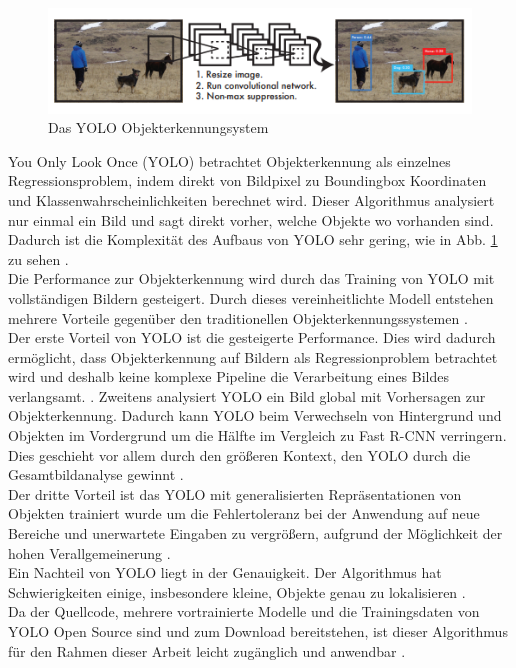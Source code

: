 {{	\begin{figure}[ht]
		\centering
		\includegraphics*[scale = 1, keepaspectratio, trim=2 2 2 2 ]{images/YOLO/YOLO_detection_system.png}
		\caption[Das YOLO Objekterkennungsystem]{Das YOLO Objekterkennungsystem \citep{Redmon2016}}
		\label{YOLO_Objectdetection}
 	\end{figure}\glqq You Only Look Once\grqq{} (YOLO) betrachtet Objekterkennung als einzelnes Regressionsproblem, indem direkt von Bildpixel zu Boundingbox Koordinaten und Klassenwahrscheinlichkeiten berechnet wird. Dieser Algorithmus analysiert nur einmal ein Bild und sagt direkt vorher, welche Objekte wo vorhanden sind. Dadurch ist die Komplexität des  Aufbaus von YOLO sehr gering, wie in Abb. \ref{YOLO_Objectdetection} zu sehen \citep{Redmon2016}. \\
	Die Performance zur Objekterkennung wird durch das Training von YOLO mit vollständigen Bildern gesteigert. Durch dieses vereinheitlichte Modell entstehen mehrere Vorteile gegenüber den traditionellen Objekterkennungssystemen \citep{Redmon2016}. \\
	Der erste Vorteil von YOLO ist die gesteigerte Performance. Dies wird dadurch ermöglicht, dass Objekterkennung auf Bildern als Regressionproblem betrachtet wird und deshalb keine komplexe Pipeline die Verarbeitung eines Bildes verlangsamt.  \citep{Redmon2016}. 
	Zweitens analysiert YOLO ein Bild global mit Vorhersagen zur Objekterkennung. Dadurch kann YOLO beim Verwechseln von Hintergrund und Objekten im Vordergrund um die Hälfte im Vergleich zu Fast R-CNN verringern. Dies geschieht vor allem durch den größeren Kontext, den YOLO durch die Gesamtbildanalyse gewinnt \citep{Redmon2016}. \\
	Der dritte Vorteil ist das YOLO mit generalisierten Repräsentationen von Objekten trainiert wurde um die Fehlertoleranz bei der Anwendung auf neue Bereiche und unerwartete Eingaben zu vergrößern, aufgrund der Möglichkeit der hohen Verallgemeinerung \citep{Redmon2016}. \\
	Ein Nachteil von YOLO liegt in der Genauigkeit. Der Algorithmus hat Schwierigkeiten einige, insbesondere kleine, Objekte genau zu lokalisieren \citep{Redmon2016}. \\
	Da der Quellcode, mehrere vortrainierte Modelle und die Trainingsdaten von YOLO Open Source sind und zum Download bereitstehen, ist dieser Algorithmus für den Rahmen dieser Arbeit leicht zugänglich und anwendbar \citep{Redmon2016}. \\

}}
